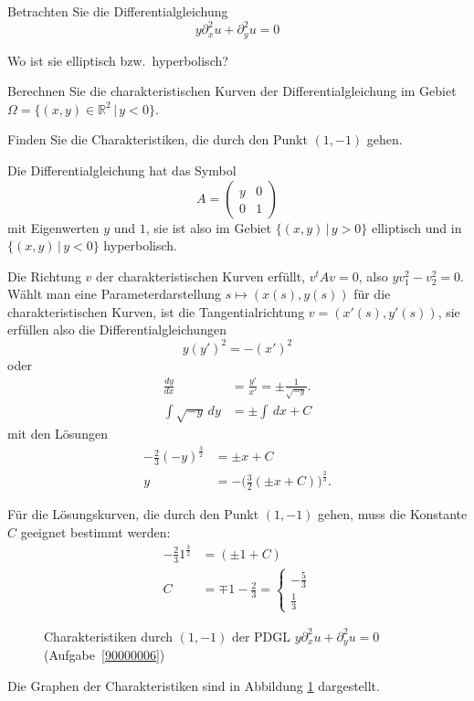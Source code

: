 Betrachten Sie die Differentialgleichung
\[
y\partial_x^2u+\partial_y^2u=0
\]
\begin{teilaufgaben}
\item
Wo ist sie elliptisch bzw.~hyperbolisch?
\item
Berechnen Sie die charakteristischen Kurven der Differentialgleichung
im Gebiet $\Omega=\{(x,y)\in\mathbb R^2\,|\,y<0\}$.
\item
Finden Sie die Charakteristiken, die durch den Punkt
$(1,-1)$ gehen.
\end{teilaufgaben}

\begin{loesung}
\begin{teilaufgaben}
\item
Die Differentialgleichung hat das Symbol
\[
A=\begin{pmatrix}y&0\\0&1\end{pmatrix}
\]
mit Eigenwerten $y$ und $1$, sie ist also im Gebiet $\{(x,y)\,|\,y>0\}$
elliptisch und in $\{(x,y)\,|\,y<0\}$ hyperbolisch.

\item
Die Richtung $v$ der charakteristischen Kurven erfüllt,
$v^tAv=0$, also $yv_1^2-v_2^2=0$. Wählt man eine
Parameterdarstellung $s\mapsto(x(s),y(s))$ für die
charakteristischen Kurven, ist die Tangentialrichtung
$v=(x'(s),y'(s))$,
sie erfüllen also
die Differentialgleichungen
\[
y(y')^2=-(x')^2
\]
oder
\begin{align*}
\frac{dy}{dx}&=\frac{y'}{x'}=\pm\frac1{\sqrt{-y}}.
\\
\int\sqrt{-y}\,dy&=\pm\int \,dx+C
\end{align*}
mit den Lösungen
\begin{align*}
-\frac23(-y)^{\frac32}&=\pm x+C
\\
y&=-\biggl(\frac32(\pm x+C)\biggr)^{\frac23}.
\end{align*}
\item
Für die Lösungskurven, die durch den Punkt $(1,-1)$ gehen,
muss die Konstante $C$ geeignet bestimmt werden:
\begin{align*}
-\frac231^{\frac32}&=(\pm1+C)\\
C&=\mp 1-\frac23
=\begin{cases}
-\frac53\\
\frac13
\end{cases}
\end{align*}
\begin{figure}
\begin{center}
\end{center}
\caption{Charakteristiken durch $(1,-1)$ der PDGL $y\partial_x^2u+\partial_y^2u=0$ (Aufgabe~\ref{90000006})
\label{90000006:char}}
\end{figure}
Die Graphen der Charakteristiken sind in Abbildung \ref{90000006:char}
dargestellt.
\qedhere
\end{teilaufgaben}
\end{loesung}
